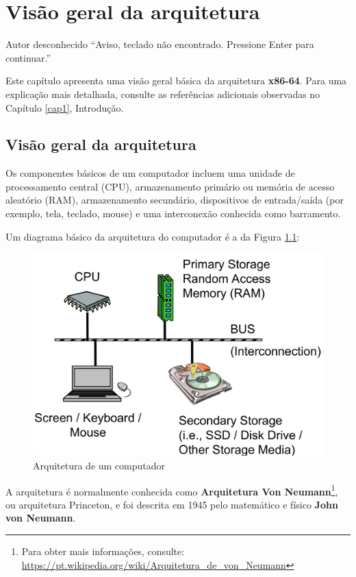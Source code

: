 \chapter{Visão geral da arquitetura}

\begin{chapquote}{Autor desconhecido}{
``Aviso, teclado não encontrado. Pressione Enter para continuar.''}
\end{chapquote}

Este capítulo apresenta uma visão geral básica da arquitetura \textbf{x86-64}. Para uma explicação mais detalhada, consulte as referências adicionais observadas no Capítulo \ref{cap1}, Introdução.

\section{Visão geral da arquitetura}
Os componentes básicos de um computador incluem uma unidade de processamento central (CPU), armazenamento primário ou memória de acesso aleatório (RAM), armazenamento secundário, dispositivos de entrada/saída (por exemplo, tela, teclado, mouse) e uma interconexão conhecida como barramento.

Um diagrama básico da arquitetura do computador é a da Figura \ref{arquiteturacomputador}:
\begin{figure}[ht]
	\includegraphics[width=\linewidth]{imagens/arquitetura}
	\caption{Arquitetura de um computador}
	\label{arquiteturacomputador}
\end{figure}

A arquitetura é normalmente conhecida como \textbf{Arquitetura Von Neumann}\footnote{Para obter mais informações, consulte: \url{https://pt.wikipedia.org/wiki/Arquitetura\_de\_von\_Neumann}}, 
ou arquitetura Princeton, e foi descrita em 1945 pelo matemático e físico \textbf{John von Neumann}.

